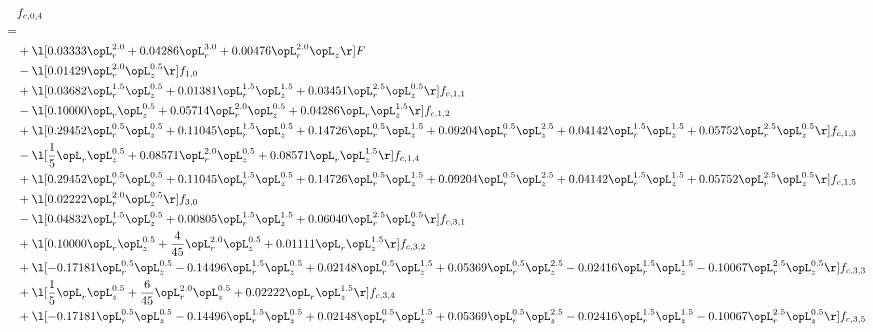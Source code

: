 \begin{alignat}{2} 
\label{eq:f_04_1} 
& f_{c,0,4} \nonumber \\ 
 = \\ 
& + \l[  0.03333 \opL_r^{2.0} +  0.04286 \opL_r^{3.0} +  0.00476 \opL_r^{2.0} \opL_z  \r] F \nonumber \\ 
& - \l[  0.01429 \opL_r^{2.0} \opL_z^{0.5}  \r] f_{1,0} \nonumber \\ 
& + \l[  0.03682 \opL_r^{1.5} \opL_z^{0.5} +  0.01381 \opL_r^{1.5} \opL_z^{1.5} +  0.03451 \opL_r^{2.5} \opL_z^{0.5}  \r] f_{c,1,1} \nonumber \\ 
& - \l[  0.10000 \opL_r \opL_z^{0.5} +  0.05714 \opL_r^{2.0} \opL_z^{0.5} +  0.04286 \opL_r \opL_z^{1.5}  \r] f_{c,1,2} \nonumber \\ 
& + \l[  0.29452 \opL_r^{0.5} \opL_z^{0.5} +  0.11045 \opL_r^{1.5} \opL_z^{0.5} +  0.14726 \opL_r^{0.5} \opL_z^{1.5} +  0.09204 \opL_r^{0.5} \opL_z^{2.5} +  0.04142 \opL_r^{1.5} \opL_z^{1.5} +  0.05752 \opL_r^{2.5} \opL_z^{0.5}  \r] f_{c,1,3} \nonumber \\ 
& - \l[ \frac{1}{5} \opL_r \opL_z^{0.5} +  0.08571 \opL_r^{2.0} \opL_z^{0.5} +  0.08571 \opL_r \opL_z^{1.5}  \r] f_{c,1,4} \nonumber \\ 
& + \l[  0.29452 \opL_r^{0.5} \opL_z^{0.5} +  0.11045 \opL_r^{1.5} \opL_z^{0.5} +  0.14726 \opL_r^{0.5} \opL_z^{1.5} +  0.09204 \opL_r^{0.5} \opL_z^{2.5} +  0.04142 \opL_r^{1.5} \opL_z^{1.5} +  0.05752 \opL_r^{2.5} \opL_z^{0.5}  \r] f_{c,1,5} \nonumber \\ 
& + \l[  0.02222 \opL_r^{2.0} \opL_z^{0.5}  \r] f_{3,0} \nonumber \\ 
& - \l[  0.04832 \opL_r^{1.5} \opL_z^{0.5} +  0.00805 \opL_r^{1.5} \opL_z^{1.5} +  0.06040 \opL_r^{2.5} \opL_z^{0.5}  \r] f_{c,3,1} \nonumber \\ 
& + \l[  0.10000 \opL_r \opL_z^{0.5} + \frac{4}{45} \opL_r^{2.0} \opL_z^{0.5} +  0.01111 \opL_r \opL_z^{1.5}  \r] f_{c,3,2} \nonumber \\ 
& + \l[  -0.17181 \opL_r^{0.5} \opL_z^{0.5}   -0.14496 \opL_r^{1.5} \opL_z^{0.5} +  0.02148 \opL_r^{0.5} \opL_z^{1.5} +  0.05369 \opL_r^{0.5} \opL_z^{2.5}   -0.02416 \opL_r^{1.5} \opL_z^{1.5}   -0.10067 \opL_r^{2.5} \opL_z^{0.5}  \r] f_{c,3,3} \nonumber \\ 
& + \l[ \frac{1}{5} \opL_r \opL_z^{0.5} + \frac{6}{45} \opL_r^{2.0} \opL_z^{0.5} +  0.02222 \opL_r \opL_z^{1.5}  \r] f_{c,3,4} \nonumber \\ 
& + \l[  -0.17181 \opL_r^{0.5} \opL_z^{0.5}   -0.14496 \opL_r^{1.5} \opL_z^{0.5} +  0.02148 \opL_r^{0.5} \opL_z^{1.5} +  0.05369 \opL_r^{0.5} \opL_z^{2.5}   -0.02416 \opL_r^{1.5} \opL_z^{1.5}   -0.10067 \opL_r^{2.5} \opL_z^{0.5}  \r] f_{c,3,5} \nonumber \\ 

\end{alignat}
